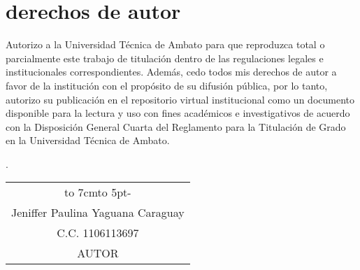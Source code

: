 \chapter*{derechos de autor}
Autorizo a la Universidad Técnica de Ambato para que reproduzca total o parcialmente
este trabajo de titulación dentro de las regulaciones legales e institucionales
correspondientes. Además, cedo todos mis derechos de autor a favor de la institución
con el propósito de su difusión pública, por lo tanto, autorizo su publicación en el
repositorio virtual institucional como un documento disponible para la lectura y uso
con fines académicos e investigativos de acuerdo con la Disposición General Cuarta
del Reglamento para la Titulación de Grado en la Universidad Técnica de Ambato.
\begin{flushright}
	\lugarFechaPrelims.
\end{flushright}

\vspace*{5cm}
\begin{center}
	\begin{tabular}{c}
		\hbox to 7cm{\leaders\hbox to 5pt{\hss-\hss}\hfil} \\
		Jeniffer Paulina Yaguana Caraguay                      \\
		C.C. 1106113697                                      \\
		AUTOR
	\end{tabular}
\end{center}
